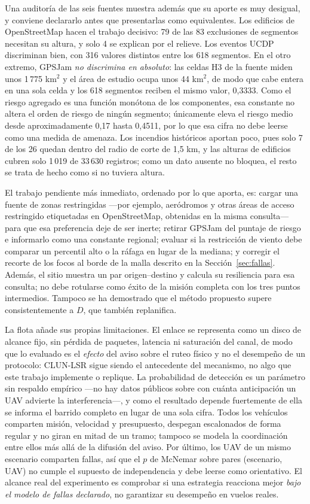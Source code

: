 \documentclass[journal,10pt]{IEEEtran}
\begin{document}
Una auditoría de las seis fuentes muestra además que su aporte es muy
desigual, y conviene declararlo antes que presentarlas como equivalentes.
Los edificios de OpenStreetMap hacen el trabajo decisivo: 79 de las 83
exclusiones de segmentos necesitan su altura, y solo 4 se explican por el
relieve. Los eventos UCDP discriminan bien, con 316 valores distintos entre
los 618 segmentos. En el otro extremo, GPSJam \emph{no discrimina en
absoluto}: las celdas H3 de la fuente miden unos 1\,775 km$^2$ y el área de
estudio ocupa unos 44 km$^2$, de modo que cabe entera en una sola celda y los
618 segmentos reciben el mismo valor, 0,3333. Como el riesgo agregado es una
función monótona de los componentes, esa constante no altera el orden de
riesgo de ningún segmento; únicamente eleva el riesgo medio desde
aproximadamente 0,17 hasta 0,4511, por lo que esa cifra no debe leerse como
una medida de amenaza. Los incendios históricos aportan poco, pues solo 7 de
los 26 quedan dentro del radio de corte de 1,5 km, y las alturas de
edificios cubren solo 1\,019 de 33\,630 registros; como un dato ausente no
bloquea, el resto se trata de hecho como si no tuviera altura.

El trabajo pendiente más inmediato, ordenado por lo que aporta, es: cargar
una fuente de zonas restringidas ---por ejemplo, aeródromos y otras áreas de
acceso restringido etiquetadas en OpenStreetMap, obtenidas en la misma
consulta--- para que esa preferencia deje de ser inerte; retirar GPSJam del
puntaje de riesgo e informarlo como una constante regional; evaluar si la
restricción de viento debe comparar un percentil alto o la ráfaga en lugar de
la mediana; y corregir el recorte de los focos al borde de la malla descrito
en la Sección~\ref{sec:fallas}. Además, el sitio muestra un par
origen--destino y calcula su resiliencia para esa consulta; no debe
rotularse como éxito de la misión completa con los tres puntos intermedios.
Tampoco se ha demostrado que el método propuesto supere consistentemente a
$D$, que también replanifica.

La flota añade sus propias limitaciones. El enlace se representa como un
disco de alcance fijo, sin pérdida de paquetes, latencia ni saturación del
canal, de modo que lo evaluado es el \emph{efecto} del aviso sobre el ruteo
físico y no el desempeño de un protocolo: CLUN-LSR sigue siendo el
antecedente del mecanismo, no algo que este trabajo implemente o replique.
La probabilidad de detección es un parámetro sin respaldo empírico ---no hay
datos públicos sobre con cuánta anticipación un UAV advierte la
interferencia---, y como el resultado depende fuertemente de ella se informa
el barrido completo en lugar de una sola cifra. Todos los vehículos
comparten misión, velocidad y presupuesto, despegan escalonados de forma
regular y no giran en mitad de un tramo; tampoco se modela la coordinación
entre ellos más allá de la difusión del aviso. Por último, los UAV de un
mismo escenario comparten fallas, así que el $p$ de McNemar sobre pares
(escenario, UAV) no cumple el supuesto de independencia y debe leerse como
orientativo. El alcance real del experimento es comprobar si una estrategia
reacciona mejor \emph{bajo el modelo de fallas declarado}, no garantizar su
desempeño en vuelos reales.
\end{document}
